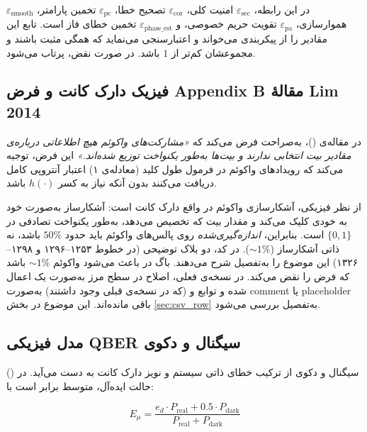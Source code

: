 در این رابطه، $\varepsilon_{\text{sec}}$ امنیت کلی، $\varepsilon_{\text{cor}}$ تصحیح خطا، $\varepsilon_{\text{pe}}$ تخمین پارامتر، $\varepsilon_{\text{smooth}}$ هموارسازی، $\varepsilon_{\text{pa}}$ تقویت حریم خصوصی، و $\varepsilon_{\text{phase\_est}}$ تخمین خطای فاز است. تابع  این مقادیر را از پیکربندی می‌خواند و اعتبارسنجی می‌نماید که همگی مثبت باشند و مجموعشان کم‌تر از $1$ باشد. در صورت نقض،  پرتاب می‌شود.

\subsection{فیزیک دارک کانت و فرض Appendix B مقالۀ Lim 2014}

در مقاله‌ی  ()،  به‌صراحت فرض می‌کند که \emph{«مشارکت‌های واکوئم هیچ اطلاعاتی درباره‌ی مقادیر بیت انتخابی ندارند و بیت‌ها به‌طور یکنواخت توزیع شده‌اند.»} این فرض، توجیه می‌کند که رویدادهای واکوئم در فرمول طول کلید (معادله‌ی ۱) اعتبار آنتروپی کامل دریافت می‌کنند بدون آنکه نیاز به کسر $h(\cdot)$ باشد.

از نظر فیزیکی، آشکارسازی واکوئم در واقع دارک کانت است: آشکارساز به‌صورت خود به خودی کلیک می‌کند و مقدار بیت که  تخصیص می‌دهد، به‌طور یکنواخت تصادفی در $\{0, 1\}$ است. بنابراین،  \emph{اندازه‌گیری‌شده} روی پالس‌های واکوئم باید حدود $50\%$ باشد، نه  ذاتی آشکارساز ($\sim 1\%$). در کد، دو بلاک توضیحی (در خطوط ۱۲۵۳–۱۲۹۶ و ۱۲۹۸–۱۳۲۶) این موضوع را به‌تفصیل شرح می‌دهند. باگ در  باعث می‌شود  واکوئم $\sim 1\%$ باشد که فرض  را نقض می‌کند. در نسخه‌ی فعلی، اصلاح در سطح مرز  به‌صورت یک  اعمال شده و توابع  و  (که در نسخه‌ی قبلی وجود داشتند) به‌صورت comment یا placeholder باقی مانده‌اند. این موضوع در بخش \ref{sec:csv_row} به‌تفصیل بررسی می‌شود.

\subsection{مدل فیزیکی QBER سیگنال و دکوی}

 () سیگنال و دکوی از ترکیب خطای ذاتی سیستم و نویز دارک کانت به دست می‌آید. در حالت ایده‌آل،  متوسط برابر است با:

\begin{equation}
	E_\mu = \frac{e_d \cdot P_{\text{real}} + 0.5 \cdot P_{\text{dark}}}{P_{\text{real}} + P_{\text{dark}}}
\end{equation}

